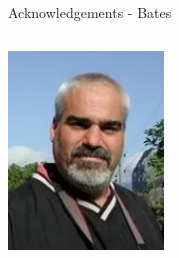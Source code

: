 \documentclass[aspectratio=169]{beamer}
\begin{document}
\begin{frame}{Acknowledgements - Bates}
\begin{columns}
            \includegraphics[width=0.95\textwidth]{people/bates/chris.png}
            
        \end{columns}   

\end{frame}
\end{document}
